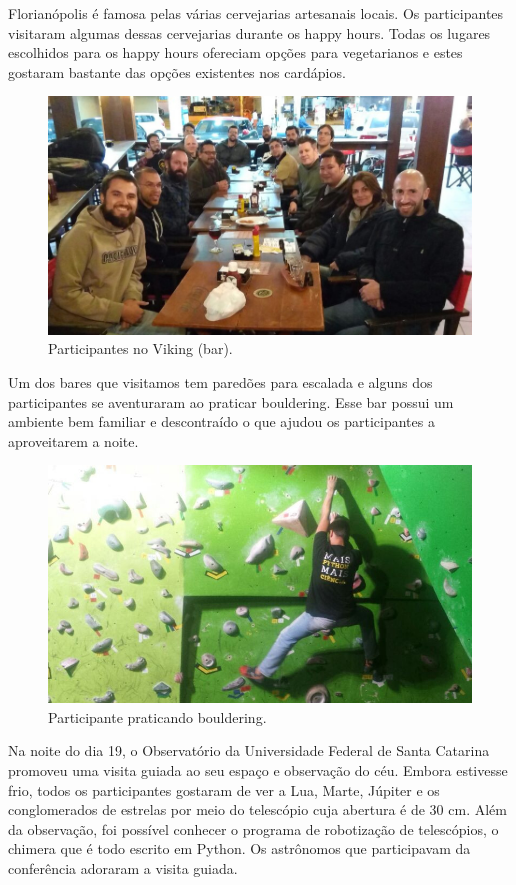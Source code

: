 \documentclass[12pt]{article}
\begin{document}
Florianópolis é famosa pelas várias cervejarias artesanais locais.
Os participantes visitaram algumas dessas cervejarias durante os happy hours.
Todas os lugares escolhidos para os happy hours ofereciam opções para
vegetarianos e estes gostaram bastante das opções existentes nos cardápios.

\begin{figure}[!htb]
\center
\includegraphics[height=.3\textheight]{social-viking.jpg}
\caption{Participantes no Viking (bar).}
\end{figure}

Um dos bares que visitamos tem paredões para escalada
e alguns dos participantes se aventuraram ao praticar bouldering.
Esse bar possui um ambiente bem familiar e descontraído
o que ajudou os participantes a aproveitarem a noite.

\begin{figure}[!htb]
\center
\includegraphics[height=.3\textheight]{python-escala.jpg}
\caption{Participante praticando bouldering.}
\end{figure}

Na noite do dia 19, o Observatório da Universidade Federal de Santa Catarina
promoveu uma visita guiada ao seu espaço e observação do céu. Embora estivesse frio, todos os participantes gostaram de ver a Lua, Marte, Júpiter e os conglomerados de estrelas por meio do telescópio cuja abertura é de 30 cm. Além da observação, foi possível conhecer o programa de robotização de telescópios, o chimera que é todo escrito em Python. Os astrônomos que participavam da conferência adoraram a visita guiada.
\end{document}
